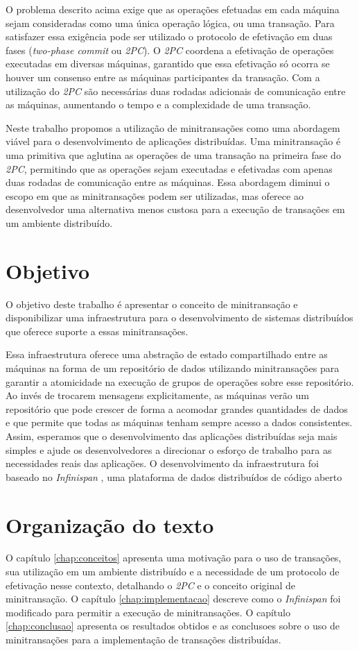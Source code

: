 \documentclass[11pt,twoside,a4paper]{book}
\begin{document}
O problema descrito acima exige que as operações efetuadas em cada máquina sejam consideradas como uma única operação lógica, ou uma transação. Para satisfazer essa exigência pode ser utilizado o protocolo de efetivação em duas fases (\emph{two-phase commit} ou \emph{2PC}). O \emph{2PC} coordena a efetivação de operações executadas em diversas máquinas, garantido que essa efetivação só ocorra se houver um consenso entre as máquinas participantes da transação. Com a utilização do \emph{2PC} são necessárias duas rodadas adicionais de comunicação entre as máquinas, aumentando o tempo e a complexidade de uma transação.

Neste trabalho propomos a utilização de minitransações como uma abordagem viável para o desenvolvimento de aplicações distribuídas. Uma minitransação é uma primitiva que aglutina as operações de uma transação na primeira fase do \emph{2PC}, permitindo que as operações sejam executadas e efetivadas com apenas duas rodadas de comunicação entre as máquinas. Essa abordagem diminui o escopo em que as minitransações podem ser utilizadas, mas oferece ao desenvolvedor uma alternativa menos custosa para a execução de transações em um ambiente distribuído.

\section{Objetivo}
\label{sec:objetivo}
O objetivo deste trabalho é apresentar o conceito de minitransação e disponibilizar uma infraestrutura para o desenvolvimento de sistemas
distribuídos que oferece suporte a essas minitransações.

Essa infraestrutura oferece uma abstração de estado compartilhado entre as máquinas na forma de um repositório de dados utilizando minitransações para garantir a atomicidade na execução de grupos de operações sobre esse repositório. Ao invés de trocarem mensagens explicitamente, as máquinas verão um repositório que pode crescer de forma a acomodar grandes quantidades de dados e que permite que todas as máquinas tenham sempre acesso a dados consistentes. Assim, esperamos que o desenvolvimento das aplicações distribuídas seja mais simples e ajude os desenvolvedores a direcionar o esforço de trabalho para as necessidades reais das aplicações. O desenvolvimento da infraestrutura foi baseado no \emph{Infinispan} \cite{infinispan}, uma plataforma de dados distribuídos de código aberto

\section{Organização do texto}
\label{sec:organizacao_do_texto}
O capítulo \ref{chap:conceitos} apresenta uma motivação para o uso de transações, sua utilização em um ambiente distribuído e a necessidade de um protocolo de efetivação nesse contexto, detalhando o \emph{2PC} e o conceito original de minitransação. O capítulo \ref{chap:implementacao} descreve como o \emph{Infinispan} foi modificado para permitir a execução de minitransações. O capítulo \ref{chap:conclusao} apresenta os resultados obtidos e as conclusoes sobre o uso de minitransações para a implementação de transações distribuídas.
\end{document}
